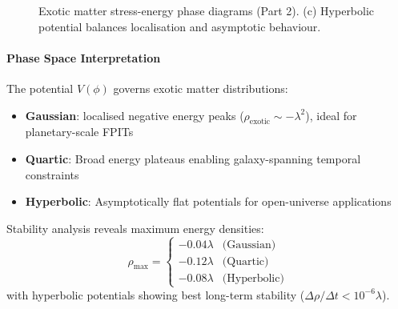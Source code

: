 \documentclass[twocolumn]{article}
\begin{document}
	\begin{figure}[htbp]
		\centering
		\captionsetup[subfloat]{font=large, margin=1cm}
		
		
		\caption{Exotic matter stress-energy phase diagrams (Part 2). 
			(c) Hyperbolic potential balances localisation and asymptotic behaviour.}
\label{fig:phase_diagrams_2}
	\end{figure}
	
	\paragraph{Phase Space Interpretation}
	The potential $V(\phi)$ governs exotic matter distributions:
	\begin{itemize}
		\item \textbf{Gaussian}: localised negative energy peaks ($\rho_{\text{exotic}} \sim -\lambda^2$), ideal for planetary-scale FPITs  
		\item \textbf{Quartic}: Broad energy plateaus enabling galaxy-spanning temporal constraints  
		\item \textbf{Hyperbolic}: Asymptotically flat potentials for open-universe applications  
	\end{itemize}
	Stability analysis reveals maximum energy densities:
	\begin{equation}
		\rho_{\text{max}} = 
		\begin{cases}
			-0.04\lambda & \text{(Gaussian)} \\
			-0.12\lambda & \text{(Quartic)} \\
			-0.08\lambda & \text{(Hyperbolic)}
		\end{cases}
	\end{equation}
	with hyperbolic potentials showing best long-term stability ($\Delta\rho/\Delta t < 10^{-6}\lambda$).
	
\end{document}
